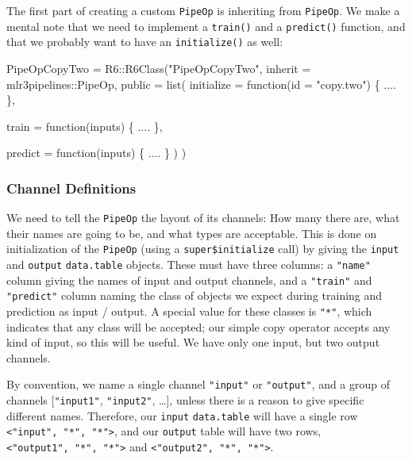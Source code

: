 \documentclass[
  11pt,
  parskip=half,
  DIV=calc,
  BCOR=10mm,
  x11names]{scrbook}
\newenvironment{Shaded}{}{}
\newcommand{\ControlFlowTok}[1]{\textcolor[rgb]{0.00,0.00,1.00}{#1}}
\newcommand{\DataTypeTok}[1]{#1}
\newcommand{\KeywordTok}[1]{\textcolor[rgb]{0.00,0.00,1.00}{#1}}
\newcommand{\NormalTok}[1]{#1}
\newcommand{\OperatorTok}[1]{#1}
\newcommand{\StringTok}[1]{\textcolor[rgb]{0.00,0.50,0.50}{#1}}
\begin{document}
The first part of creating a custom \texttt{PipeOp} is inheriting from \texttt{PipeOp}.
We make a mental note that we need to implement a \texttt{train()} and a \texttt{predict()} function, and that we probably want to have an \texttt{initialize()} as well:

\begin{Shaded}
\begin{Highlighting}[]
\NormalTok{PipeOpCopyTwo =}\StringTok{ }\NormalTok{R6}\OperatorTok{::}\KeywordTok{R6Class}\NormalTok{(}\StringTok{"PipeOpCopyTwo"}\NormalTok{,}
  \DataTypeTok{inherit =}\NormalTok{ mlr3pipelines}\OperatorTok{::}\NormalTok{PipeOp,}
  \DataTypeTok{public =} \KeywordTok{list}\NormalTok{(}
    \DataTypeTok{initialize =} \ControlFlowTok{function}\NormalTok{(}\DataTypeTok{id =} \StringTok{"copy.two"}\NormalTok{) \{}
\NormalTok{      ....}
\NormalTok{    \},}

    \DataTypeTok{train =} \ControlFlowTok{function}\NormalTok{(inputs) \{}
\NormalTok{      ....}
\NormalTok{    \},}

    \DataTypeTok{predict =} \ControlFlowTok{function}\NormalTok{(inputs) \{}
\NormalTok{      ....}
\NormalTok{    \}}
\NormalTok{  )}
\NormalTok{)}
\end{Highlighting}
\end{Shaded}

\hypertarget{channel-definitions}{%
\subsubsection{Channel Definitions}\label{channel-definitions}}

We need to tell the \texttt{PipeOp} the layout of its channels: How many there are, what their names are going to be, and what types are acceptable.
This is done on initialization of the \texttt{PipeOp} (using a \texttt{super\$initialize} call) by giving the \texttt{input} and \texttt{output} \texttt{data.table} objects.
These must have three columns: a \texttt{"name"} column giving the names of input and output channels, and a \texttt{"train"} and \texttt{"predict"} column naming the class of objects we expect during training and prediction as input / output.
A special value for these classes is \texttt{"*"}, which indicates that any class will be accepted; our simple copy operator accepts any kind of input, so this will be useful. We have only one input, but two output channels.

By convention, we name a single channel \texttt{"input"} or \texttt{"output"}, and a group of channels {[}\texttt{"input1"}, \texttt{"input2"}, \ldots{}{]}, unless there is a reason to give specific different names. Therefore, our \texttt{input} \texttt{data.table} will have a single row \texttt{\textless{}"input",\ "*",\ "*"\textgreater{}}, and our \texttt{output} table will have two rows, \texttt{\textless{}"output1",\ "*",\ "*"\textgreater{}} and \texttt{\textless{}"output2",\ "*",\ "*"\textgreater{}}.
\end{document}
